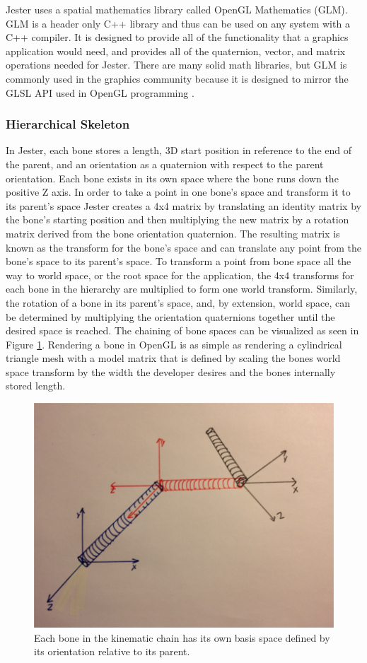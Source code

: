 Jester uses a spatial mathematics library called OpenGL Mathematics (GLM). GLM is a header only C++ library and thus can be used on any system with a C++ compiler. It is designed to provide all of the functionality that a graphics application would need, and provides all of the quaternion, vector, and matrix operations needed for Jester. There are many solid math libraries, but GLM is commonly used in the graphics community because it is designed to mirror the GLSL API used in OpenGL programming \cite{glm}.

\subsubsection{Hierarchical Skeleton}\label{sec:bone_hierarchy}

In Jester, each bone stores a length, 3D start position in reference to the end of the parent, and an orientation as a quaternion with respect to the parent orientation. Each bone exists in its own space where the bone runs down the positive Z axis. In order to take a point in one bone's space and transform it to its parent's space Jester creates a 4x4 matrix by translating an identity matrix by the bone's starting position and then multiplying the new matrix by a rotation matrix derived from the bone orientation quaternion. The resulting matrix is known as the transform for the bone's space and can translate any point from the bone's space to its parent's space. To transform a point from bone space all the way to world space, or the root space for the application, the 4x4 transforms for each bone in the hierarchy are multiplied to form one world transform. Similarly, the rotation of a bone in its parent's space, and, by extension, world space, can be determined by multiplying the orientation quaternions together until the desired space is reached. The chaining of bone spaces can be visualized as seen in Figure \ref{fig:joint_spaces}. Rendering a bone in OpenGL is as simple as rendering a cylindrical triangle mesh with a model matrix that is defined by scaling the bones world space transform by the width the developer desires and the bones internally stored length.

\begin{figure}[]
\centering
\includegraphics[width=.5\textwidth]{figures/spaceChain}
\caption{Each bone in the kinematic chain has its own basis space defined by its orientation relative to its parent.}
\label{fig:joint_spaces}
\end{figure}

